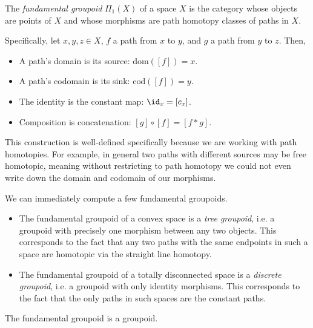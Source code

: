 \begin{dfn}
	The \textit{fundamental groupoid} $\Pi_1(X)$ of a space $X$ is the category whose
	objects are points of $X$ and whose morphisms are path homotopy classes of
	paths in $X$.
\end{dfn}

Specifically, let $x,y,z\in X$, $f$ a path from $x$ to $y$, and $g$ a path from
$y$ to $z$. Then,

\begin{itemize}
	\item A path's domain is its source: $\text{dom}([f]) = x$.
	\item A path's codomain is its sink: $\text{cod}([f]) = y$.
	\item The identity is the constant map: $\id_x = [c_x]$.
	\item Composition is concatenation: $[g]\circ [f] = [f*g]$.
\end{itemize}

This construction is well-defined specifically because we are working with path
homotopies. For example, in general two paths with different sources may be
free homotopic, meaning without restricting to path homotopy we could not even
write down the domain and codomain of our morphisms.

\begin{ex}
	We can immediately compute a few fundamental groupoids.
	\begin{itemize}
		\item The fundamental groupoid of a convex space is a \emph{tree groupoid},
		      i.e. a groupoid with precisely one morphism between any two objects.
		      This corresponds to the fact that any two paths with the same
		      endpoints in such a space are homotopic via the straight line
		      homotopy.
		\item The fundamental groupoid of a totally disconnected space is a
		      \emph{discrete groupoid}, i.e. a groupoid with only identity morphisms.
		      This corresponds to the fact that the only paths in such spaces are the
		      constant paths.
	\end{itemize}
\end{ex}

\begin{prop}\label{fundamental groupoid is a groupoid}
	The fundamental groupoid is a groupoid.
\end{prop}

